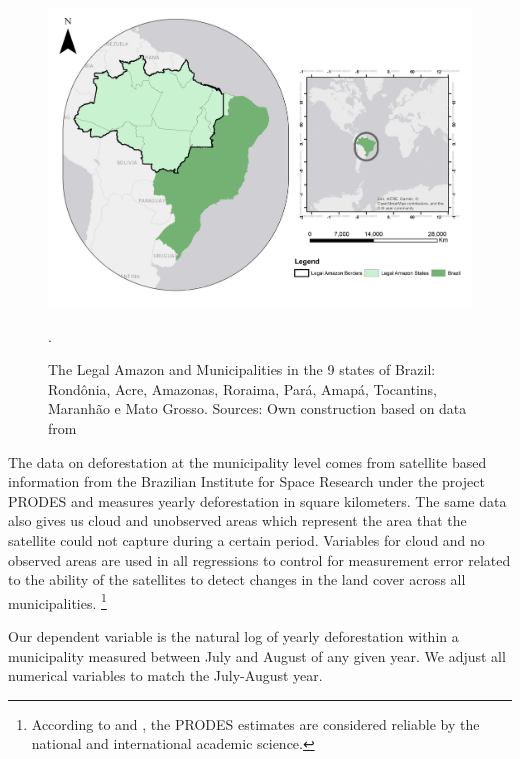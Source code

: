 \begin{figure}[H]
\centering
\includegraphics[width=1\textwidth, inner]{Chapter1/Chapter1_map_brazil_insect.png}
\caption[The Legal Amazon and Municipalities in the 9 states of Brazil]{The Legal Amazon and Municipalities in the 9 states of Brazil: Rond\^{o}nia, Acre, Amazonas, Roraima, Par\'{a}, Amap\'{a}, Tocantins, Maranh\~{a}o e Mato Grosso. Sources: Own construction based on data from \citet{inpe, IBGE1}}.
\label{fig:1}
\end{figure}

The data on deforestation at the municipality level comes from satellite based information from the Brazilian Institute for Space Research \citep{inpe} under the project PRODES and measures yearly deforestation in square kilometers.  The same data also gives us cloud and unobserved areas which represent the area that the satellite could not capture during a certain period. Variables for cloud and no observed areas are used in all regressions to control for measurement error related to the ability of the satellites to detect changes in the land cover across all municipalities. \footnote{According to \citet{kintisch_2007} and \citet{achard_stibig_eva_lindquist_bouvet_arino_mayaux_2010}, the PRODES estimates are considered reliable by the national and international academic science.}

Our dependent variable is the natural log of yearly deforestation within a municipality measured between July and August of any given year. We adjust all numerical variables to match the July-August year.


